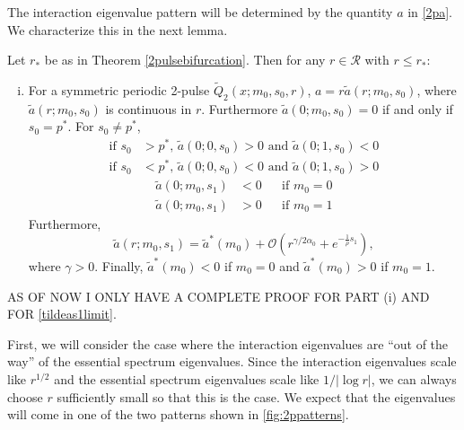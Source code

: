 \documentclass[thesis.tex]{subfiles}
\begin{document}
The interaction eigenvalue pattern will be determined by the quantity $a$ in \cref{2pa}. We characterize this in the next lemma.

\begin{lemma}\label{lemma:chara}
Let $r_*$ be as in Theorem \ref{2pulsebifurcation}. Then for any $r \in \mathcal{R}$ with $r \leq r_*$:
\begin{enumerate}[(i)]
	\item For a symmetric periodic 2-pulse $\tilde{Q}_2(x; m_0, s_0, r)$, $a = r \tilde{a}(r; m_0, s_0)$, where $\tilde{a}(r; m_0, s_0)$ is continuous in $r$. Furthermore $\tilde{a}(0; m_0, s_0) = 0$ if and only if $s_0 = p^*$. For $s_0 \neq p^*$,
	\begin{equation}
	\begin{aligned}
	\text{if }s_0 &> p^*, \, \tilde{a}(0; 0, s_0) > 0 \text{ and } \tilde{a}(0; 1, s_0) < 0 \\
	\text{if }s_0 &< p^*, \, \tilde{a}(0; 0, s_0) < 0 \text{ and } \tilde{a}(0; 1, s_0) > 0 
	\end{aligned}
	\end{equation}
	\begin{equation}
	\begin{aligned}
	\tilde{a}(0; m_0, s_1) &< 0 && \text{if }m_0 = 0 \\
	\tilde{a}(0; m_0, s_1) &> 0 && \text{if }m_0 = 1
	\end{aligned}
	\end{equation}
	Furthermore,
	\begin{equation}\label{tildeas1limit}
	\tilde{a}(r; m_0, s_1) = \tilde{a}^*(m_0) + \mathcal{O}\left(r^{\gamma/2\alpha_0} + e^{-\frac{1}{\rho}s_1} \right),
	\end{equation}
	where $\gamma > 0$. Finally, $\tilde{a}^*(m_0) < 0$ if $m_0 = 0$ and $\tilde{a}^*(m_0) > 0$ if $m_0 = 1$.
\end{enumerate}	
\end{lemma}
AS OF NOW I ONLY HAVE A COMPLETE PROOF FOR PART (i) AND FOR \cref{tildeas1limit}.

First, we will consider the case where the interaction eigenvalues are ``out of the way'' of the essential spectrum eigenvalues. Since the interaction eigenvalues scale like $r^{1/2}$ and the essential spectrum eigenvalues scale like $1/|\log r|$, we can always choose $r$ sufficiently small so that this is the case. We expect that the eigenvalues will come in one of the two patterns shown in \cref{fig:2ppatterns}.
\end{document}
